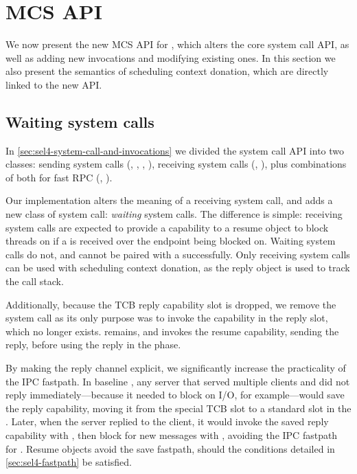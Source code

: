 \section{MCS API}
\label{s:new-api}

We now present the new \gls{MCS} API for \selfour, which alters the core system call API, 
as well as adding new invocations and modifying existing ones. In this section we also
present the semantics of scheduling context donation, which are directly linked to the new API.

\subsection{Waiting system calls}

In \cref{sec:sel4-system-call-and-invocations} we divided the \selfour system call API into two
classes: sending system calls (\send, \nbsend, \call, \reply),
receiving system calls (\recv, \nbrecv), plus combinations of both for fast 
RPC (\call, \replyrecv).  

Our implementation alters the meaning of a receiving system call, and adds a new class of system
call: \emph{waiting} system calls. The difference is simple: receiving system calls are expected to
provide a capability to a resume object to block threads on if a \call is received over
the endpoint being blocked on. Waiting system calls do not, and cannot be paired with a \call
successfully. Only receiving system calls can be used with scheduling context donation, as the reply
object is used to track the call stack.

Additionally, because the TCB reply capability slot is dropped, we remove the \reply system
call as its only purpose was to invoke the capability in the reply slot, which no longer exists.
\replyrecv remains, and invokes the resume capability, sending the reply, before using the
reply in the \recv phase. 

By making the reply channel explicit, we significantly increase the practicality of the IPC
fastpath. In baseline \selfour, any server that served multiple clients and did not reply
immediately---because it needed to block on I/O, for example---would save the reply
capability, moving it from the special TCB slot to a standard slot in the \cspace. Later, when
the server replied to the client, it would invoke the saved reply capability with \send, then block
for new messages with \recv, avoiding the IPC fastpath for \replyrecv. Resume objects avoid the save
fastpath, should the conditions detailed in \cref{sec:sel4-fastpath} be satisfied.

